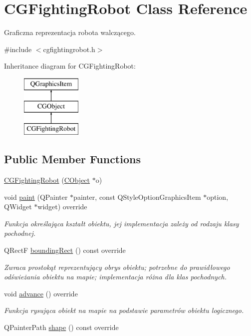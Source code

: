 \hypertarget{class_c_g_fighting_robot}{}\section{C\+G\+Fighting\+Robot Class Reference}
\label{class_c_g_fighting_robot}


Graficzna reprezentacja robota walczącego.  




{\ttfamily \#include $<$cgfightingrobot.\+h$>$}

Inheritance diagram for C\+G\+Fighting\+Robot\+:\begin{figure}[H]
\begin{center}
\leavevmode
\includegraphics[height=3.000000cm]{class_c_g_fighting_robot}
\end{center}
\end{figure}
\subsection*{Public Member Functions}
\begin{DoxyCompactItemize}
\item 
\mbox{\hyperlink{class_c_g_fighting_robot_ae05396a82beb9769197b6295654dece5}{C\+G\+Fighting\+Robot}} (\mbox{\hyperlink{class_c_object}{C\+Object}} $\ast$o)
\item 
void \mbox{\hyperlink{class_c_g_fighting_robot_ad269a29840cb25ecb91f5a3c609ff4dd}{paint}} (Q\+Painter $\ast$painter, const Q\+Style\+Option\+Graphics\+Item $\ast$option, Q\+Widget $\ast$widget) override
\begin{DoxyCompactList}\small\item\em Funkcja określająca kształt obiektu, jej implementacja zależy od rodzaju klasy pochodnej. \end{DoxyCompactList}\item 
Q\+RectF \mbox{\hyperlink{class_c_g_fighting_robot_a945d974c6e61507a9f671ab7288df85a}{bounding\+Rect}} () const override
\begin{DoxyCompactList}\small\item\em Zwraca prostokąt reprezentujący obrys obiektu; potrzebne do prawidłowego odświeżania obiektu na mapie; implementacja różna dla klas pochodnych. \end{DoxyCompactList}\item 
void \mbox{\hyperlink{class_c_g_fighting_robot_aee1cbe4ebdf24953ff3a9def4338c283}{advance}} () override
\begin{DoxyCompactList}\small\item\em Funkcja rysująca obiekt na mapie na podstawie parametrów obiektu logicznego. \end{DoxyCompactList}\item 
Q\+Painter\+Path \mbox{\hyperlink{class_c_g_fighting_robot_a5ddec756ac208dd8f8044028b376ace9}{shape}} () const override
\end{DoxyCompactItemize}
